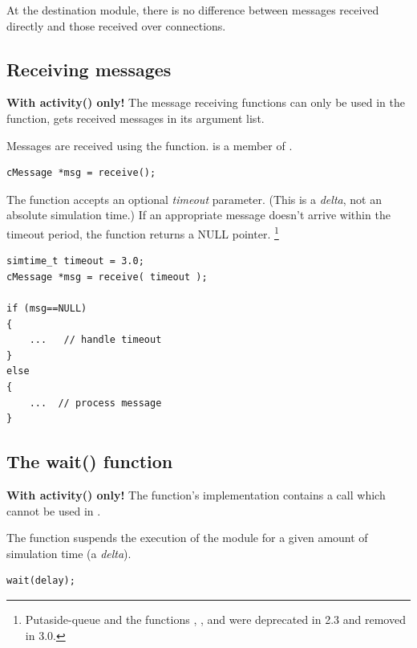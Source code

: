 At the destination module, there is no difference between messages received
directly and those received over connections.



\subsection{Receiving messages}
\label{sec:simple-modules:receiving-messages}

\textbf{With activity() only!} The message receiving functions can
only be used in the  function,
 gets received messages in its argument list.

Messages are received using the  function.
 is a member of .

\begin{verbatim}
cMessage *msg = receive();
\end{verbatim}

The  function accepts an optional \textit{timeout}
parameter. (This is a \textit{delta}, not an
absolute simulation time.) If an appropriate message doesn't arrive
within the timeout period, the function returns a NULL pointer.
    \footnote{Putaside-queue and the functions ,
    , and  were deprecated
    in {\opp} 2.3 and removed in {\opp} 3.0.}

\begin{verbatim}
simtime_t timeout = 3.0;
cMessage *msg = receive( timeout );

if (msg==NULL)
{
    ...   // handle timeout
}
else
{
    ...  // process message
}
\end{verbatim}



\subsection{The wait() function}
\label{sec:simple-modules:wait}

\textbf{With activity() only!} The  function's implementation
contains a  call which cannot be used in .

The  function suspends the execution of the module for
a given amount of simulation time (a \textit{delta}).

\begin{verbatim}
wait(delay);
\end{verbatim}

